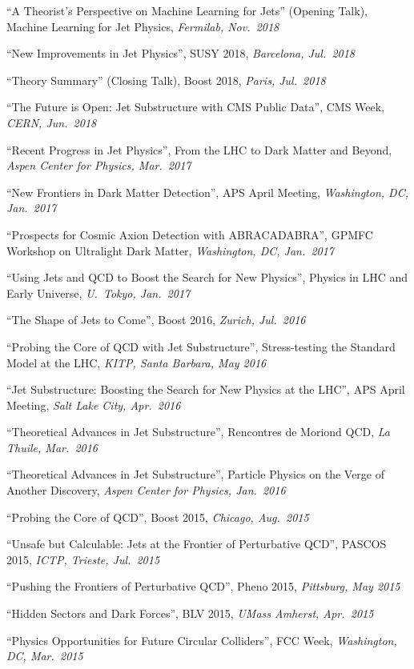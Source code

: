 \documentclass[11pt]{article}
\begin{document}
\item ``A Theorist's Perspective on Machine Learning for Jets'' (Opening Talk), Machine Learning for Jet Physics, \textit{Fermilab, Nov.~2018}
\item ``New Improvements in Jet Physics'', SUSY 2018, \textit{Barcelona, Jul.~2018}
\item ``Theory Summary'' (Closing Talk), Boost 2018, \textit{Paris, Jul.~2018}
\item ``The Future is Open: Jet Substructure with CMS Public Data'', CMS Week, \textit{CERN, Jun.~2018}
\item ``Recent Progress in Jet Physics'', From the LHC to Dark Matter and Beyond, \textit{Aspen Center for Physics, Mar.~2017}
\item ``New Frontiers in Dark Matter Detection'', APS April Meeting, \textit{Washington, DC, Jan.~2017}
\item ``Prospects for Cosmic Axion Detection with ABRACADABRA'', GPMFC Workshop on Ultralight Dark Matter, \textit{Washington, DC, Jan.~2017}
\item ``Using Jets and QCD to Boost the Search for New Physics'', Physics in LHC and Early Universe, \textit{U.~Tokyo, Jan.~2017}
\item ``The Shape of Jets to Come'', Boost 2016, \textit{Zurich, Jul.~2016}
\item ``Probing the Core of QCD with Jet Substructure'', Stress-testing the Standard Model at the LHC, \textit{KITP, Santa Barbara, May 2016}
\item ``Jet Substructure: Boosting the Search for New Physics at the LHC'', APS April Meeting, \textit{Salt Lake City, Apr.~2016}
\item ``Theoretical Advances in Jet Substructure'', Rencontres de Moriond QCD, \textit{La Thuile, Mar.~2016}
\item ``Theoretical Advances in Jet Substructure'', Particle Physics on the Verge of Another Discovery, \textit{Aspen Center for Physics, Jan.~2016}
\item ``Probing the Core of QCD'', Boost 2015, \textit{Chicago, Aug.~2015}
\item ``Unsafe but Calculable: Jets at the Frontier of Perturbative QCD'', PASCOS 2015, \textit{ICTP, Trieste, Jul.~2015}
\item ``Pushing the Frontiers of Perturbative QCD'', Pheno 2015, \textit{Pittsburg, May 2015}
\item ``Hidden Sectors and Dark Forces'', BLV 2015, \textit{UMass Amherst, Apr.~2015}
\item ``Physics Opportunities for Future Circular Colliders'', FCC Week, \textit{Washington, DC, Mar.~2015}
\end{document}
